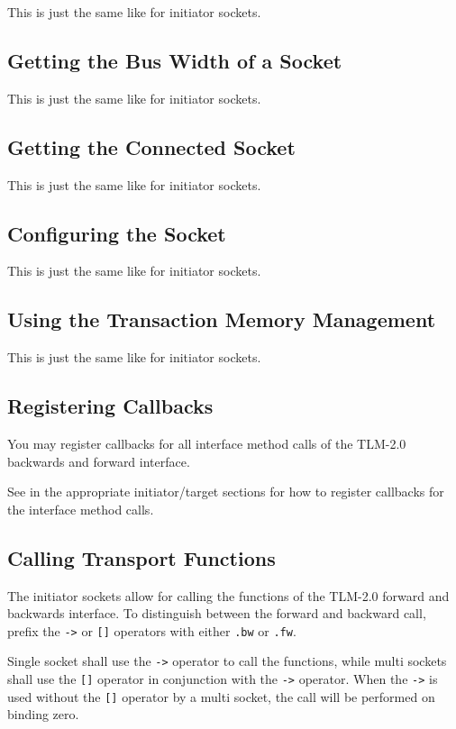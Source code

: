 \documentclass[a4paper,10pt]{article}          %
\begin{document}
This is just the same like for initiator sockets.

\subsection{Getting the Bus Width of a Socket}

This is just the same like for initiator sockets.

\subsection{Getting the Connected Socket}

This is just the same like for initiator sockets.

\subsection{Configuring the Socket}

This is just the same like for initiator sockets.

\subsection{Using the Transaction Memory Management}

This is just the same like for initiator sockets.

\subsection{Registering Callbacks}
You may register callbacks for all interface method calls of the TLM-2.0 backwards and forward interface.

See in the appropriate initiator/target sections for how to register callbacks for the interface method calls.
\subsection{Calling Transport Functions}

The initiator sockets allow for calling the functions of the TLM-2.0 forward and backwards interface.
To distinguish between the forward and backward call, prefix the \verb|->| or \verb|[]| operators with either \verb|.bw| or \verb|.fw|.

Single socket shall use the \verb|->| operator to call the functions, while multi sockets shall use the \verb|[]| operator in conjunction with the \verb|->| operator.
When the \verb|->| is used without the \verb|[]| operator by a multi socket, the call will be performed on binding zero.
\end{document}
